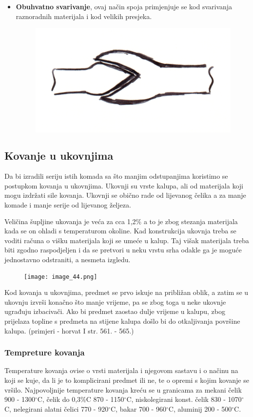 \documentclass[a4paper,12pt]{article}
\numberwithin{figure}{section}
\begin{document}
\begin{itemize}
\begin{figure}[!h]
\end{figure}
\FloatBarrier\item \textbf{Obuhvatno svarivanje}, ovaj način spoja primjenjuje se kod svarivanja raznoradnih materijala i kod velikih presjeka.
\begin{figure}[!h]
\centering
\includegraphics[scale=0.15]{image_43-3.png}
\end{figure}
\FloatBarrier\end{itemize}
\subsection{Kovanje u ukovnjima}
Da bi izradili seriju istih komada sa što manjim odstupanjima koristimo se postupkom kovanja u ukovnjima. Ukovnji su vrste kalupa, ali od materijala koji mogu izdržati sile kovanja. Ukovnji se obično rade od lijevanog čelika a za manje komade i manje serije od lijevanog željeza.\par
Veličina šupljine ukovanja je veća za cca 1,2\% a to je zbog stezanja materijala kada se on ohladi s temperaturom okoline. Kad konstrukcija ukovnja treba se voditi računa o višku materijala koji se umeće u kalup. Taj višak materijala treba biti zgodno raspodjeljen i da se pretvori u neku vrstu srha odakle ga je moguće jednostavno odstraniti, a nesmeta izgledu.
\begin{figure}[!h]
\centering
\texttt{[image: image\_44.png]}
\end{figure}
\FloatBarrier
Kod kovanja u ukovnjima, predmet se prvo iskuje na približan oblik, a zatim se u ukovnju izvrši konačno što manje vrijeme, pa se zbog toga u neke ukovnje ugrađuju izbacivači. Ako bi predmet zaostao dulje vrijeme u kalupu, zbog prijelaza topline s predmeta na stijene kalupa došlo bi do otkaljivanja površine kalupa. (primjeri - horvat I str. 561. - 565.)
\subsubsection{Tempreture kovanja}
Temperature kovanja ovise o vrsti materijala i njegovom sastavu i o načinu na koji se kuje, da li je to komplicirani predmet ili ne, te o opremi s kojim kovanje se vršilo. Najpovoljnije temperature kovanja kreću se u granicama za mekani čelik 900 - 1300$^{\circ}$C, čelik do 0,3$\%$C 870 - 1150$^{\circ}$C, niskolegirani konst. čelik 830 - 1070$^{\circ}$C, nelegirani alatni čelici 770 - 920$^{\circ}$C, bakar 700 - 960$^{\circ}$C, aluminij 200 - 500$^{\circ}$C.
\clearpage
\end{document}
